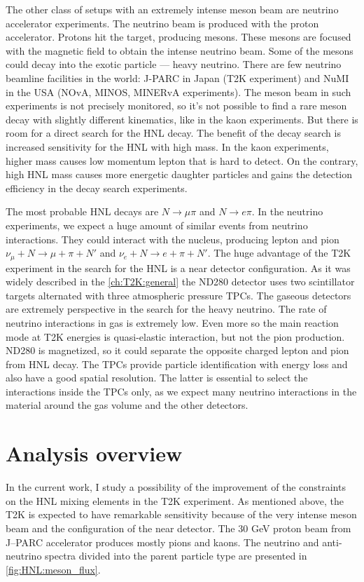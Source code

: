 \documentclass[../main.tex]{subfiles}
\begin{document}
The other class of setups with an extremely intense meson beam are neutrino accelerator experiments. The neutrino beam is produced with the proton accelerator. Protons hit the target, producing mesons. These mesons are focused with the magnetic field to obtain the intense neutrino beam. Some of the mesons could decay into the exotic particle --- heavy neutrino. There are few neutrino beamline facilities in the world: J-PARC in Japan (T2K experiment) and NuMI in the USA (NOvA, MINOS, MINERvA experiments). The meson beam in such experiments is not precisely monitored, so it's not possible to find a rare meson decay with slightly different kinematics, like in the kaon experiments. But there is room for a direct search for the HNL decay. The benefit of the decay search is increased sensitivity for the HNL with high mass. In the kaon experiments, higher mass causes low momentum lepton that is hard to detect. On the contrary, high HNL mass causes more energetic daughter particles and gains the detection efficiency in the decay search experiments.

The most probable HNL decays are $N\to\mu\pi$ and $N\to e\pi$. In the neutrino experiments, we expect a huge amount of similar events from neutrino interactions. They could interact with the nucleus, producing lepton and pion $\nu_\mu+N\to\mu+\pi+N'$ and $\nu_e+N\to e+\pi+N'$. The huge advantage of the T2K experiment in the search for the HNL is a near detector configuration. As it was widely described in the \autoref{ch:T2K:general} the ND280 detector uses two scintillator targets alternated with three atmospheric pressure TPCs. The gaseous detectors are extremely perspective in the search for the heavy neutrino. The rate of neutrino interactions in gas is extremely low. Even more so the main reaction mode at T2K energies is quasi-elastic interaction, but not the pion production. ND280 is magnetized, so it could separate the opposite charged lepton and pion from HNL decay. The TPCs provide particle identification with energy loss and also have a good spatial resolution. The latter is essential to select the interactions inside the TPCs only, as we expect many neutrino interactions in the material around the gas volume and the other detectors.

\section{Analysis overview}
In the current work, I study a possibility of the improvement of the constraints on the HNL mixing elements in the T2K experiment. As mentioned above, the T2K is expected to have remarkable sensitivity because of the very intense meson beam and the configuration of the near detector. The 30 GeV proton beam from J--PARC accelerator produces mostly pions and kaons. The neutrino and anti-neutrino spectra divided into the parent particle type are presented in \autoref{fig:HNL:meson_flux}.
\end{document}
